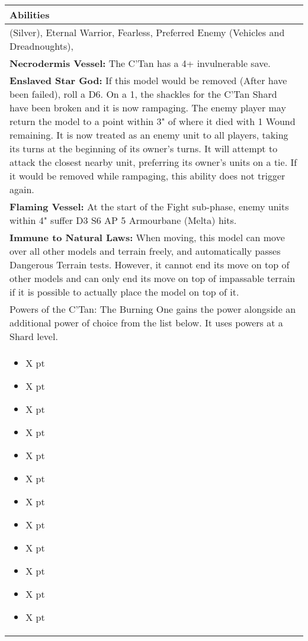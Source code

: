 \noindent
\begin{tabular}{||m{532pt}||}
	\hline
	Abilities \\
	\hline
	\quickref{Awakening Protocols} (Silver), Eternal Warrior, Fearless, Preferred Enemy (Vehicles and Dreadnoughts), \quickref{Reanimation Protocols} \\
	\textbf{Necrodermis Vessel:} The C'Tan has a 4+ invulnerable save. \\
	\textbf{Enslaved Star God:} If this model would be removed (After \quickref{Reanimation Protocols} have been failed), roll a D6. On a 1, the shackles for the C'Tan Shard have been broken and it is now rampaging. The enemy player may return the model to a point within 3" of where it died with 1 Wound remaining. It is now treated as an enemy unit to all players, taking its turns at the beginning of its owner's turns. It will attempt to attack the closest nearby unit, preferring its owner's units on a tie. If it would be removed while rampaging, this ability does not trigger again. \\
	\textbf{Flaming Vessel:} At the start of the Fight sub-phase, enemy units within 4" suffer D3 S6 AP 5 Armourbane (Melta) hits.\\
	\textbf{Immune to Natural Laws:} When moving, this model can move over all other models and terrain 	freely, and automatically passes Dangerous Terrain tests. However, it 	cannot end its move on top of other models and can only end its move on top of impassable terrain if it is possible to actually place the model on top of it. \\
	Powers of the C'Tan: The Burning One gains the \quickref{Lord of Fire} power alongside an additional power of choice from the list below. It uses powers at a Shard level. \\
	\begin{itemize}
		\item \quickref{Antimatter Meteor} \hrulefill X pt
		\item \quickref{Cosmic Fire} \hrulefill X pt
		\item \quickref{Entropic Touch} \hrulefill X pt
		\item \quickref{Moulder of Worlds} \hrulefill X pt
		\item \quickref{Pyreshards} \hrulefill X pt
		\item \quickref{Sentient Singularity} \hrulefill X pt
		\item \quickref{Seismic Assault} \hrulefill X pt
		\item \quickref{Sky of Falling Stars} \hrulefill X pt
		\item \quickref{Swarm of Spirit Dust} \hrulefill X pt
		\item \quickref{Time's Arrow} \hrulefill X pt
		\item \quickref{Transdimensional Thunderbolt} \hrulefill X pt
		\item \quickref{Withering Worldscape} \hrulefill X pt
	\end{itemize} \\
	\hline
\end{tabular}


